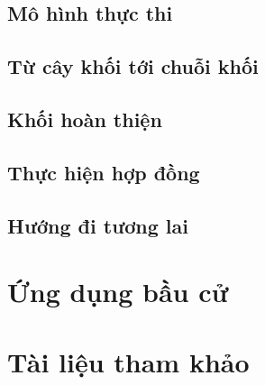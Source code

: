 \documentclass[12pt]{article}
\begin{document}
		\subsection{Mô hình thực thi}
				
		
		\subsection{Từ cây khối tới chuỗi khối}
		
		
		\subsection{Khối hoàn thiện}
		
		
		\subsection{Thực hiện hợp đồng}
		
		
		\subsection{Hướng đi tương lai}
			
	
	\newpage
	\section{Ứng dụng bầu cử}
	
	
	\newpage
	\section{Tài liệu tham khảo}
	
\end{document}
